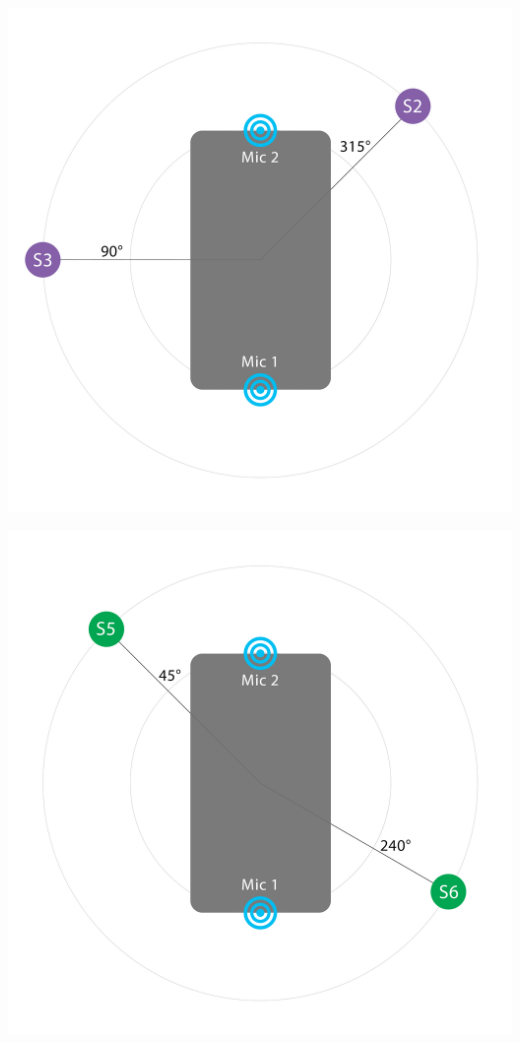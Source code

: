 \vspace*{-3.9em}\noindent
\begin{minipage}{\linewidth}\noindent
\begin{multicols}{2}
\begin{Figure}
    \centering
    \includegraphics[width=0.99\linewidth]{fig/2mix1.png}
    \label{fig:2mix1}
\end{Figure}
\begin{Figure}
    \centering
    \includegraphics[width=0.99\linewidth]{fig/2mix2.png}

\end{Figure}
\end{multicols}
\end{minipage}
